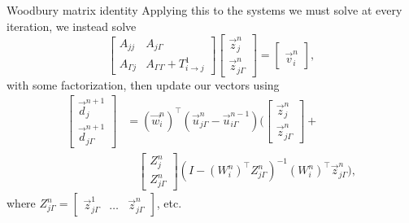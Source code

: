 \documentclass{beamer}
\begin{document}
\begin{frame}{Woodbury matrix identity}
Applying this to the systems we must solve at every iteration, we instead solve
\begin{equation*}
	\begin{bmatrix} A_{jj} & A_{j \Gamma} \\ A_{\Gamma j} & A_{\Gamma \Gamma} + T_{i \to j}^1 \end{bmatrix}
	\begin{bmatrix} \vec{z}_j^n \\ \vec{z}_{j \Gamma}^n \end{bmatrix}
	= \begin{bmatrix} ~ \\ \vec{v}_i^n \end{bmatrix},
\end{equation*}
with some factorization, then update our vectors using
\begin{align*}
	\begin{bmatrix} \vec{d}_j^{n+1} \\ \vec{d}_{j \Gamma}^{n+1} \end{bmatrix}
	 & = (\vec{w}_i^n)^\top \left ( \vec{u}_{j \Gamma}^n - \vec{u}_{i \Gamma}^{n-1} \right )
	\Bigg ( \begin{bmatrix} \vec{z}_j^n \\ \vec{z}_{j \Gamma}^n \end{bmatrix}
	+ \\ & \quad \begin{bmatrix} Z_j^n \\ Z_{j \Gamma}^n \end{bmatrix}
	\left ( I - (W_i^n)^\top Z_{j \Gamma}^n \right )^{-1} (W_i^n)^\top \vec{z}_{j \Gamma}^n \Bigg ) ,
\end{align*}
where $Z_{j \Gamma}^n = \begin{bmatrix} \vec{z}_{j \Gamma}^1 & \dots & \vec{z}_{j \Gamma}^n \end{bmatrix}$, etc.
\end{frame}
\end{document}
